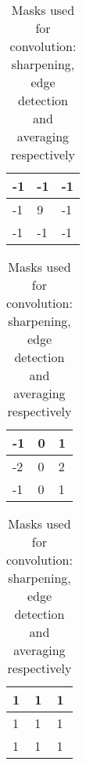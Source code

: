 \begin{table}[]
\centering
\begin{tabular}{|l|l|l|}
\hline
-1 & -1 & -1 \\ \hline
-1 & 9  & -1 \\ \hline
-1 & -1 & -1 \\ \hline
\end{tabular}
\hspace{0.5cm}
\begin{tabular}{|l|l|l|}
\hline
-1 & 0 & 1 \\ \hline
-2 & 0  & 2 \\ \hline
-1 & 0 & 1 \\ \hline
\end{tabular}
\hspace{0.5cm}
\begin{tabular}{|l|l|l|}
\hline
1 & 1 & 1 \\ \hline
1 & 1  & 1 \\ \hline
1 & 1 & 1 \\ \hline
\end{tabular}
\caption{Masks used for convolution: sharpening, edge detection and averaging respectively}
\label{tab:my-table}
\end{table}

